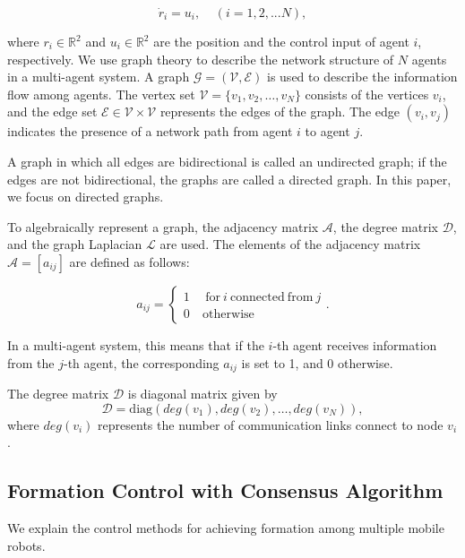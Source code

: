 \documentclass[a4paper,fleqn,10pt,twocolumn]{SICE_ISCS}
\begin{document}
\begin{equation}
	\label{modeling}
	\dot{r}_i=u_i,\ \ \ \ \ (i=1,2,...N),
\end{equation}

\noindent where $r_i \in {\mathbb{R}}^2$ and $u_i \in {\mathbb{R}}^2$ are the position and the control input of agent $i$, respectively. We use graph theory to describe the network structure of $N$ agents in a multi-agent system. A graph $ {\mathcal{G}} = (\mathcal{V}, \mathcal{E})$ is used to describe the information flow among agents. The vertex set ${\mathcal{V}} =\{v_1, v_2, \ldots, v_N\}$ consists of the vertices $v_i$, and the edge set ${{\mathcal{E}}\in {\mathcal{V}}\times{\mathcal{V}}}$ represents the edges of the graph. The edge $(v_i,v_j)$ indicates the presence of a network path from agent $i$ to agent $j$.

A graph in which all edges are bidirectional is called an undirected graph; if the edges are not bidirectional, the graphs are called a directed graph. In this paper, we focus on directed graphs.

To algebraically represent a graph, the adjacency matrix $\mathcal{A}$, the degree matrix $\mathcal{D}$, and the graph Laplacian $\mathcal{L}$ are used. The elements of the adjacency matrix ${\mathcal{A}} = [a_{ij}]$ are defined as follows:

\begin{equation}
	a_{ij}=
	\begin{cases}
		1 &\ \ {\mathrm{for}}\ i\ \mathrm{connected\ from}\ j\\
		0 &	\ \mathrm{otherwise}
	\end{cases}.
\end{equation}

In a multi-agent system, this means that if the $i$-th agent receives information from the $j$-th agent, the corresponding $a_{ij}$ is set to 1, and 0 otherwise.

The degree matrix $\mathcal{D}$ is diagonal matrix given by \begin{equation} {\mathcal{D}} = {\mathrm{diag}}(deg(v_1), deg(v_2), \dots, deg(v_N)), \end{equation}
where $deg(v_i)$ represents the number of communication links connect to node $v_i$.
\subsection{Formation Control with Consensus Algorithm}
We explain the control methods for achieving formation among multiple mobile robots.
\end{document}
